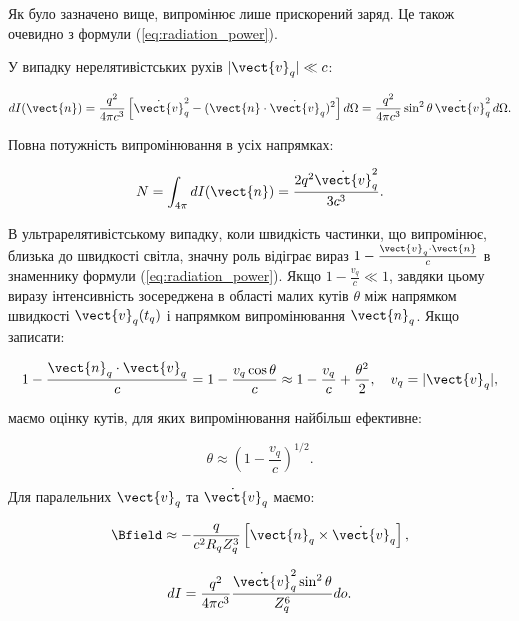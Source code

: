 Як було зазначено вище, випромінює лише прискорений заряд. Це також очевидно з формули (\ref{eq:radiation_power}).

У випадку нерелятивістських рухів \( |\vect{v}_q| \ll c \):

\begin{equation*}
	dI(\vect{n}) = \frac{q^2}{4\pi c^3} \left[ \dot{\vect{v}}_q^2 - (\vect{n} \cdot \dot{\vect{v}}_q)^2 \right] d\Omega = \frac{q^2}{4\pi c^3} \sin^2 \theta
	\, \dot{\vect{v}}_q^2 \, d\Omega.
\end{equation*}

Повна потужність випромінювання в усіх напрямках:

\begin{equation}
	N = \int_{4\pi} dI(\vect{n}) = \frac{2q^2 \dot{\vect{v}}_q^2}{3c^3}.
	\label{eq:total_power_nonrel}
\end{equation}

В ультрарелятивістському випадку, коли швидкість частинки, що випромінює, близька до швидкості світла, значну роль відіграє вираз \( 1 -
\frac{\vect{v}_q \cdot \vect{n}}{c} \) в знаменнику формули (\ref{eq:radiation_power}). Якщо \( 1 - \frac{v_q}{c} \ll 1 \), завдяки цьому виразу
інтенсивність зосереджена в області малих кутів \( \theta \) між напрямком швидкості \( \vect{v}_q(t_q) \) і напрямком випромінювання \( \vect{n}_q \).
Якщо записати:

\begin{equation*}
	1 - \frac{\vect{n}_q \cdot \vect{v}_q}{c} = 1 - \frac{v_q \cos \theta}{c} \approx 1 - \frac{v_q}{c} + \frac{\theta^2}{2}, \quad v_q = |\vect{v}_q|,
\end{equation*}

маємо оцінку кутів, для яких випромінювання найбільш ефективне:

\begin{equation}
	\theta \approx \left( 1 - \frac{v_q}{c} \right)^{1/2}.
	\label{eq:effective_angle}
\end{equation}

Для паралельних \( \vect{v}_q \) та \( \dot{\vect{v}}_q \) маємо:

\begin{equation*}
	\Bfield \approx -\frac{q}{c^2 R_q Z_q^3} \left[ \vect{n}_q \times \dot{\vect{v}}_q \right],
\end{equation*}

\begin{equation}
	dI = \frac{q^2}{4\pi c^3} \frac{\dot{\vect{v}}_q^2 \sin^2 \theta}{Z_q^6} do.
	\label{eq:radiation_power_parallel}
\end{equation}

